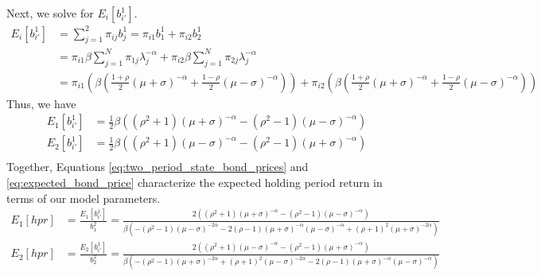 \documentclass[french]{article}
\begin{document}
\begin{enumerate}[I.]
 Next, we solve for $E_i\left[b_{i'}^1\right]$. 
 \begin{equation}
 \begin{split}
  	E_i\left[b_{i'}^1\right] &= \sum_{j=1}^2 \pi_{ij}b^1_j=\pi_{i1}b^1_1 + \pi_{i2}b^1_2\\
  	&= \pi_{i1}\beta \sum_{j=1}^{N}\pi_{1j}\lambda_j^{-\alpha} + \pi_{i2}\beta \sum_{j=1}^{N}\pi_{2j}\lambda_j^{-\alpha}\\
  	&= \pi_{i1}\left(\beta \left(\frac{1+\rho}{2}(\mu+\sigma)^{-\alpha} + \frac{1-\rho}{2}(\mu-\sigma)^{-\alpha}\right)\right) + \pi_{i2}\left(\beta \left(\frac{1+\rho}{2}(\mu+\sigma)^{-\alpha} + \frac{1-\rho}{2}(\mu-\sigma)^{-\alpha}\right)\right)
 \end{split}
 \label{eq:expected_bond_price}
 \end{equation}
 Thus, we have 
 \begin{equation*}
 	\begin{split}
 	E_1\left[b^1_{i'}\right] & = \frac{1}{2} \beta \left(\left(\rho^2+1\right) (\mu +\sigma
 	)^{-\alpha }-\left(\rho^2-1\right) (\mu -\sigma)^{-\alpha }\right)\\
 	E_2\left[b^1_{i'}\right] & = \frac{1}{2} \beta \left(\left(\rho^2+1\right) (\mu -\sigma
 	)^{-\alpha }-\left(\rho^2-1\right) (\mu +\sigma)^{-\alpha }\right)\\
 	\end{split}
 \end{equation*}
 Together, Equations \ref{eq:two_period_state_bond_prices} and \ref{eq:expected_bond_price} characterize the expected holding period return in terms of our model parameters. 
 \begin{equation*}
 	\begin{split}
 	E_1\left[hpr\right] &= \frac{E_1\left[b^1_{i'}\right]}{b^2_1}=\frac{2 \left(\left(\rho ^2+1\right) (\mu +\sigma
 		)^{-\alpha }-\left(\rho ^2-1\right) (\mu -\sigma
 		)^{-\alpha }\right)}{\beta  \left(-\left(\rho
 		^2-1\right) (\mu -\sigma )^{-2 \alpha }-2 (\rho -1)
 		(\mu +\sigma )^{-\alpha } (\mu -\sigma )^{-\alpha
 		}+(\rho +1)^2 (\mu +\sigma )^{-2 \alpha }\right)}\\
 	E_2\left[hpr\right] &= \frac{E_2\left[b^1_{i'}\right]}{b^2_2}= \frac{2 \left(\left(\rho ^2+1\right) (\mu -\sigma)^{-\alpha }-\left(\rho ^2-1\right) (\mu+\sigma)^{-\alpha}\right)}{\beta\left(-\left(\rho^2-1\right)(\mu +\sigma )^{-2 \alpha }+(\rho +1)^2(\mu -\sigma )^{-2 \alpha }-2 (\rho -1) (\mu+\sigma)^{-\alpha}(\mu-\sigma)^{-\alpha
 		}\right)}
 	\end{split}
 \end{equation*}

\end{enumerate}
\end{document}
